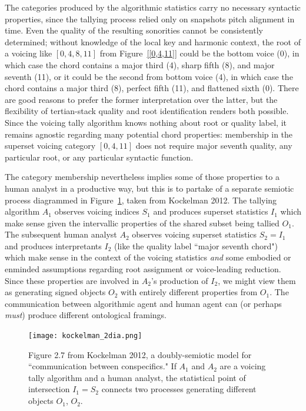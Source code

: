 The categories produced by the algorithmic statistics carry no necessary syntactic properties, since the tallying process relied only on snapshots pitch alignment in time.  Even the quality of the resulting sonorities cannot be consistently determined; without knowledge of the local key and harmonic context, the root of a voicing like $[0,4,8,11]$ from Figure~\ref{[0,4,11]} could be the bottom voice (0), in which case the chord contains a major third (4), sharp fifth (8), and major seventh (11), or it could be the second from bottom voice (4), in which case the chord contains a major third (8), perfect fifth (11), and flattened sixth (0).  There are good reasons to prefer the former interpretation over the latter, but the flexibility of tertian-stack quality and root identification renders both possible.  Since the voicing tally algorithm knows nothing about root or quality label, it remains agnostic regarding many potential chord properties: membership in the superset voicing category $[0,4,11]$ does not require major seventh quality, any particular root, or any particular syntactic function.

The category membership nevertheless implies some of those properties to a human analyst in a productive way, but this is to partake of a separate semiotic process diagrammed in Figure~\ref{kockelman_2dia}, taken from Kockelman 2012.  The tallying algorithm $A_1$ observes voicing indices $S_1$ and produces superset statistics $I_1$ which make sense given the intervallic properties of the shared subset being tallied $O_1$.  The subsequent human analyst $A_2$ observes voicing superset statistics $S_2 = I_1$ and produces interpretants $I_2$ (like the quality label ``major seventh chord") which make sense in the context of the voicing statistics \emph{and} some embodied or enminded assumptions regarding root assignment or voice-leading reduction.  Since these properties are involved in $A_2$'s production of $I_2$, we might view them as generating signed objects $O_2$ with entirely different properties from $O_1$.  The communication between algorithmic agent and human agent can (or perhaps \emph{must}) produce different ontological framings.

\begin{figure}%
	\centering
	\texttt{[image: kockelman\_2dia.png]}
	\caption{Figure 2.7 from Kockelman 2012, a doubly-semiotic model for ``communication between conspecifics."  If $A_1$ and $A_2$ are a voicing tally algorithm and a human analyst, the statistical point of intersection $I_1 = S_2$ connects two processes generating different objects $O_1$, $O_2$.}
	\label{kockelman_2dia}
\end{figure}

